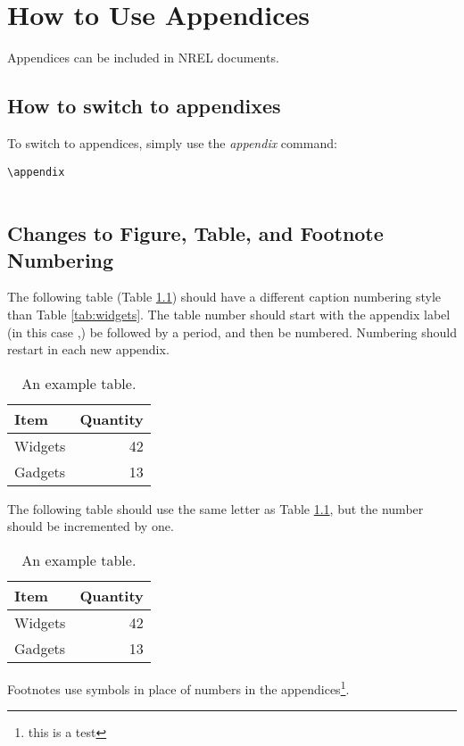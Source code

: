 \chapter{How to Use Appendices}
Appendices can be included in NREL documents. 

\section{How to switch to appendixes}
To switch to appendices, simply use the \emph{appendix} command:

\begin{lstlisting}
\appendix


\end{lstlisting}

\section{Changes to Figure, Table, and Footnote Numbering}
The following table (Table \ref{tab:AppAWidgets}) should have a different caption numbering style than Table \ref{tab:widgets}. The table number should start with the appendix label (in this case \thechapter,) be followed by a period, and then be numbered. Numbering should restart in each new appendix.

\begin{table}[!h]
\centering
\caption{An example table.}\label{tab:AppAWidgets}
\begin{tabular}{lr}
Item & Quantity \\
\hline
Widgets & 42 \\
Gadgets & 13
\end{tabular}
\end{table}

The following table should use the same letter as Table \ref{tab:AppAWidgets}, but the number should be incremented by one.

\begin{table}[!h]
\centering
\caption{An example table.}\label{tab:AppAWidgetsTwo}
\begin{tabular}{lr}
Item & Quantity \\
\hline
Widgets & 42 \\
Gadgets & 13
\end{tabular}
\end{table}

Footnotes use symbols in place of numbers in the appendices\footnote{this is a test}.